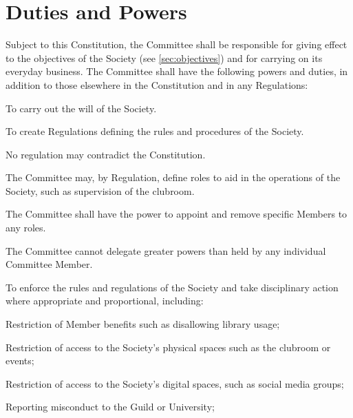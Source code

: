 \documentclass[a4paper]{article}
\begin{document}
\section{Duties and Powers} \label{sec:duties}
\begin{myEnumerate}
    \item Subject to this Constitution, the Committee shall be responsible for giving effect to the objectives of the Society (see \cref{sec:objectives}) and for carrying on its everyday business. The Committee shall have the following powers and duties, in addition to those elsewhere in the Constitution and in any Regulations:
        \begin{myEnumerate}
            \item To carry out the will of the Society.
            \item To create Regulations defining the rules and procedures of the Society.
            \begin{myEnumerate}
                \item No regulation may contradict the Constitution.
            \end{myEnumerate}
            \item The Committee may, by Regulation, define roles to aid in the operations of the Society, such as supervision of the clubroom.
            \begin{myEnumerate}
                \item The Committee shall have the power to appoint and remove specific Members to any roles.
                \item The Committee cannot delegate greater powers than held by any individual Committee Member.
            \end{myEnumerate}
            \item \label{item:disciplinary_action} To enforce the rules and regulations of the Society and take disciplinary action where appropriate and proportional, including:
            \begin{myEnumerate}
                \item Restriction of Member benefits such as disallowing library usage;
                \item Restriction of access to the Society’s physical spaces such as the clubroom or events;
                \item Restriction of access to the Society’s digital spaces, such as social media groups;
                \item Reporting misconduct to the Guild or University;

\end{myEnumerate}
\end{myEnumerate}
\end{myEnumerate}
\end{document}
